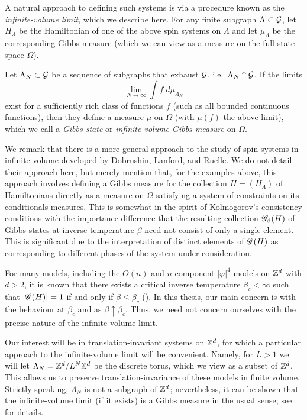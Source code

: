 A natural approach to defining such systems is via a procedure known as the
\emph{infinite-volume limit}, which we describe here. For any
finite subgraph $\Lambda \subset \mathcal{G}$, let $H_\Lambda$ be the Hamiltonian
of one of the above spin systems on $\Lambda$ and let $\mu_\Lambda$ be the
corresponding Gibbs measure (which we can view as a measure on the full state
space $\Omega$).

Let $\Lambda_N \subset \mathcal{G}$ be a sequence of subgraphs that exhaust
$\mathcal{G}$, i.e.\ $\Lambda_N \uparrow \mathcal{G}$. If the limits
\begin{equation}
\lim_{N\to\infty} \int f \; d\mu_{\Lambda_N}
\end{equation}
exist for a sufficiently rich class of functions $f$ (such as all bounded continuous functions), then they define a measure $\mu$ on $\Omega$ (with $\mu(f)$ the above limit), which we call a \emph{Gibbs state} or
\emph{infinite-volume Gibbs measure} on $\Omega$.

We remark that there is a more general approach to the study of spin systems in infinite volume developed by Dobrushin, Lanford, and Ruelle. We do not detail their approach here, but merely mention that, for the examples above, this approach involves defining a Gibbs measure for the collection
$H = (H_\Lambda)$ of Hamiltonians directly as a measure on $\Omega$ satisfying a system of constraints on its conditionals measures. This is somewhat in the spirit of Kolmogorov's consistency conditions with the importance difference that the resulting collection $\mathscr{G}_\beta(H)$ of Gibbs states at inverse temperature
$\beta$ need not consist of only a single element. This is significant due to the interpretation of distinct elements of $\mathscr{G}(H)$ as corresponding to different phases of the system under consideration.

For many models, including the $O(n)$ and $n$-component $|\varphi|^4$ models on ${ {{\mathbb Z}}^d }$ with $d > 2$, it is known that there exists a critical inverse temperature $\beta_c < \infty$ such that
$|\mathscr{G}(H)| = 1$ if and only if $\beta \le \beta_c$ (\REF). In this thesis, our main concern is with the behaviour at $\beta_c$ and as
$\beta \uparrow \beta_c$. Thus, we need not concern ourselves with the precise nature of the infinite-volume limit.

\begin{rk}
Our interest will be in translation-invariant systems on ${ {{\mathbb Z}}^d }$, for which a particular approach to the infinite-volume limit will be convenient. Namely, for $L > 1$ we will let $\Lambda_N = { {{\mathbb Z}}^d }/L^N{ {{\mathbb Z}}^d }$ be the discrete torus, which we view as a subset of ${ {{\mathbb Z}}^d }$. This allows us to preserve
translation-invariance of these models in finite volume. Strictly speaking, $\Lambda_N$ is not a subgraph of ${ {{\mathbb Z}}^d }$; nevertheless, it can be shown that the infinite-volume limit (if it exists) is a Gibbs measure in the usual sense; see \cite[Example 4.20]{Georgii11} for details.
\end{rk}

